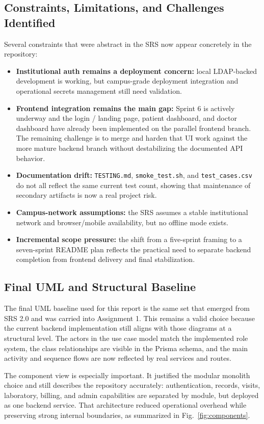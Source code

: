 \documentclass[conference]{IEEEtran}
\begin{document}
\subsection{Constraints, Limitations, and Challenges Identified}
Several constraints that were abstract in the SRS now appear concretely in the repository:
\begin{itemize}
    \item \textbf{Institutional auth remains a deployment concern:} local LDAP-backed development is working, but campus-grade deployment integration and operational secrets management still need validation.
    \item \textbf{Frontend integration remains the main gap:} Sprint 6 is actively underway and the login / landing page, patient dashboard, and doctor dashboard have already been implemented on the parallel frontend branch. The remaining challenge is to merge and harden that UI work against the more mature backend branch without destabilizing the documented API behavior.
    \item \textbf{Documentation drift:} \texttt{TESTING.md}, \texttt{smoke\_test.sh}, and \texttt{test\_cases.csv} do not all reflect the same current test count, showing that maintenance of secondary artifacts is now a real project risk.
    \item \textbf{Campus-network assumptions:} the SRS assumes a stable institutional network and browser/mobile availability, but no offline mode exists.
    \item \textbf{Incremental scope pressure:} the shift from a five-sprint framing to a seven-sprint README plan reflects the practical need to separate backend completion from frontend delivery and final stabilization.
\end{itemize}

\subsection{Final UML and Structural Baseline}
The final UML baseline used for this report is the same set that emerged from SRS 2.0 and was carried into Assignment 1. This remains a valid choice because the current backend implementation still aligns with those diagrams at a structural level. The actors in the use case model match the implemented role system, the class relationships are visible in the Prisma schema, and the main activity and sequence flows are now reflected by real services and routes.

The component view is especially important. It justified the modular monolith choice and still describes the repository accurately: authentication, records, visits, laboratory, billing, and admin capabilities are separated by module, but deployed as one backend service. That architecture reduced operational overhead while preserving strong internal boundaries, as summarized in Fig.~\ref{fig:components}.
\end{document}
